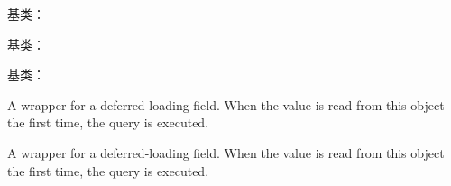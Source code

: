 \documentclass[letterpaper,10pt,english]{sphinxmanual}
\begin{document}
\begin{fulllineitems}
\label{\detokenize{index:lexer.models.File}}
基类：

\begin{fulllineitems}
\label{\detokenize{index:lexer.models.File.DoesNotExist}}
基类：

\end{fulllineitems}


\begin{fulllineitems}
\label{\detokenize{index:lexer.models.File.MultipleObjectsReturned}}
基类：

\end{fulllineitems}


\begin{fulllineitems}
\label{\detokenize{index:lexer.models.File.content}}
A wrapper for a deferred-loading field. When the value is read from this
object the first time, the query is executed.

\end{fulllineitems}


\begin{fulllineitems}
\label{\detokenize{index:lexer.models.File.id}}
A wrapper for a deferred-loading field. When the value is read from this
object the first time, the query is executed.

\end{fulllineitems}


\end{fulllineitems}
\end{document}
